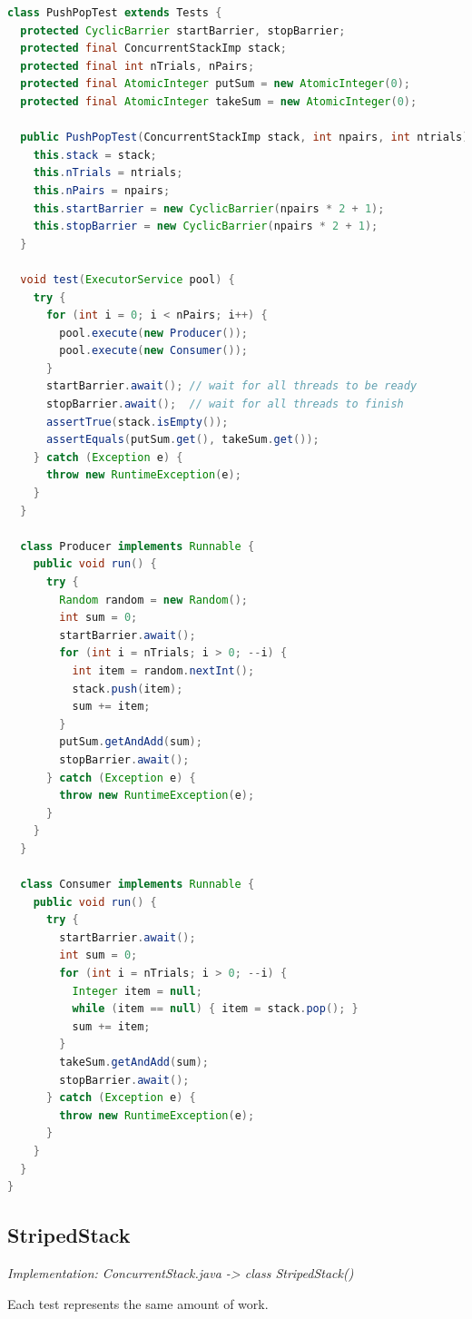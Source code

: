 \documentclass[format=acmsmall, review=false, screen=true]{acmart}
\begin{document}
\begin{lstlisting}[language=java]
class PushPopTest extends Tests {
  protected CyclicBarrier startBarrier, stopBarrier;
  protected final ConcurrentStackImp stack;
  protected final int nTrials, nPairs;
  protected final AtomicInteger putSum = new AtomicInteger(0);
  protected final AtomicInteger takeSum = new AtomicInteger(0);

  public PushPopTest(ConcurrentStackImp stack, int npairs, int ntrials) {
    this.stack = stack;
    this.nTrials = ntrials;
    this.nPairs = npairs;
    this.startBarrier = new CyclicBarrier(npairs * 2 + 1);
    this.stopBarrier = new CyclicBarrier(npairs * 2 + 1);
  }

  void test(ExecutorService pool) {
    try {
      for (int i = 0; i < nPairs; i++) {
        pool.execute(new Producer());
        pool.execute(new Consumer());
      }
      startBarrier.await(); // wait for all threads to be ready
      stopBarrier.await();  // wait for all threads to finish
      assertTrue(stack.isEmpty());
      assertEquals(putSum.get(), takeSum.get());
    } catch (Exception e) {
      throw new RuntimeException(e);
    }
  }

  class Producer implements Runnable {
    public void run() {
      try {
        Random random = new Random();
        int sum = 0;
        startBarrier.await();
        for (int i = nTrials; i > 0; --i) {
          int item = random.nextInt();
          stack.push(item);
          sum += item;
        }
        putSum.getAndAdd(sum);
        stopBarrier.await();
      } catch (Exception e) {
        throw new RuntimeException(e);
      }
    }
  }

  class Consumer implements Runnable {
    public void run() {
      try {
        startBarrier.await();
        int sum = 0;
        for (int i = nTrials; i > 0; --i) {
          Integer item = null;
          while (item == null) { item = stack.pop(); }
          sum += item;
        }
        takeSum.getAndAdd(sum);
        stopBarrier.await();
      } catch (Exception e) {
        throw new RuntimeException(e);
      }
    }
  }
}
\end{lstlisting}


\subsection{StripedStack}

\textit{Implementation: ConcurrentStack.java -> class StripedStack()}

Each test represents the same amount of work.
\end{document}
